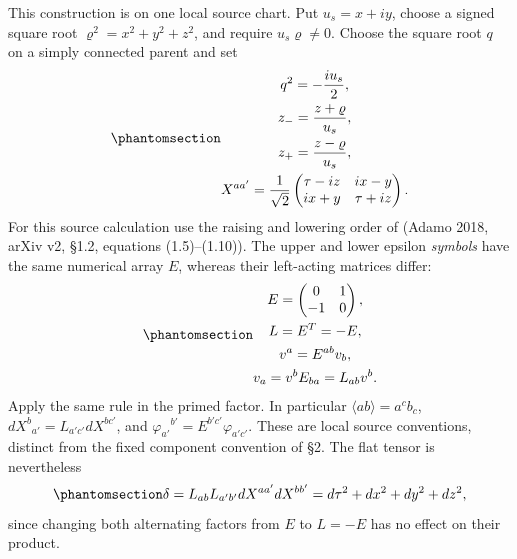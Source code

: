 \documentclass[
  english,
  11pt,
  reqno]{amsart}
\begin{document}
This construction is on one local source chart. Put \(u_s=x+iy\), choose
a signed square root \(\varrho^2=x^2+y^2+z^2\), and require
\(u_s\varrho\ne0\). Choose the square root \(q\) on a simply connected
parent and set
\begin{equation}\protect\phantomsection\label{eq:sh-r1-source-coordinates}{\begin{gathered}
q^2=-\frac{iu_s}{2}, \\
z_-=\frac{z+\varrho}{u_s}, \\
z_+=\frac{z-\varrho}{u_s}, \\
X^{aa'}=\frac1{\sqrt2}
 \begin{pmatrix}\tau-iz&ix-y\\ix+y&\tau+iz\end{pmatrix}.
\end{gathered}}\end{equation} For this source calculation use the raising and lowering
order of (Adamo 2018, arXiv v2, §1.2, equations (1.5)--(1.10)). The
upper and lower epsilon \emph{symbols} have the same numerical array
\(E\), whereas their left-acting matrices differ:
\begin{equation}\protect\phantomsection\label{eq:sh-r1-source-index-order}{\begin{gathered}
E=\begin{pmatrix}0&1\\-1&0\end{pmatrix}, \\
L=E^T=-E, \\
v^a=E^{ab}v_b, \\
v_a=v^bE_{ba}=L_{ab}v^b.
\end{gathered}}\end{equation} Apply the same rule in the primed factor. In particular
\(\langle ab\rangle=a^cb_c\), \(dX^b{}_{a'}=L_{a'c'}dX^{bc'}\), and
\(\varphi_{a'}{}^{b'}=E^{b'c'}\varphi_{a'c'}\). These are local source
conventions, distinct from the fixed component convention of §2. The
flat tensor is nevertheless
\begin{equation}\protect\phantomsection\label{eq:sh-r1-source-flat-metric}{
 \delta=L_{ab}L_{a'b'}dX^{aa'}dX^{bb'}
       =d\tau^2+dx^2+dy^2+dz^2,
}\end{equation} since changing both alternating factors from \(E\) to
\(L=-E\) has no effect on their product.
\end{document}
